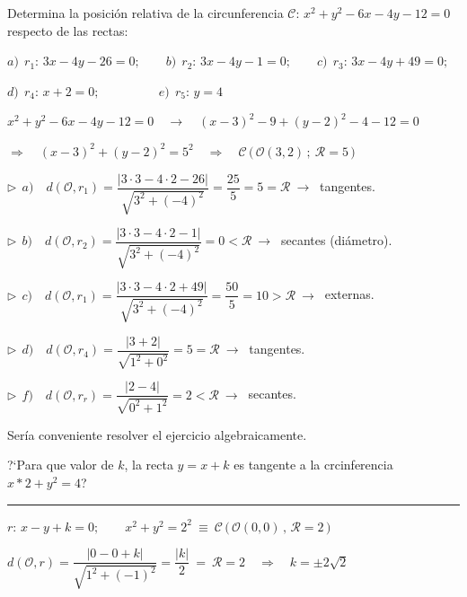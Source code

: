 \begin{miejemplo}

Determina la posición relativa de la circunferencia $\mathcal C:\, x^2+y^2-6x-4y-12=0$	 respecto de las rectas:

\vspace{2mm}$a)\ \ r_1:\, 3x-4y-26=0;\qquad b)\ \ r_2:\, 3x-4y-1=0;\qquad c)\ \ r_3:\, 3x-4y+49=0;$

\vspace{2mm}$d)\ \ r_4:\, x+2=0;\qquad \qquad \ \ \ e)\ \ r_5:\, y=4$

\vspace{6mm} $x^2+y^2-6x-4y-12=0 \quad \to \quad (x-3)^2-9+(y-2)^2-4-12=0 \ $

\vspace{2mm} \hspace{3cm} $\Rightarrow \quad (x-3)^2+(y-2)^2=5^2 \quad \Rightarrow \quad \mathcal C\, \Big( \, \mathcal O(3,2)\, ; \ \mathcal R=5\, \Big)$

\vspace{6mm} $\triangleright \ \ a)\quad d(\mathcal O,r_1)=\dfrac{|3\cdot 3-4\cdot 2-26|}{\sqrt{3^2+(-4)^2}}=\dfrac{25}{5}=5=\mathcal R \ \to \ $ tangentes.
 
\vspace{4mm} $\triangleright \ \ b)\quad d(\mathcal O,r_2)=\dfrac{|3\cdot 3-4\cdot 2-1|}{\sqrt{3^2+(-4)^2}}=0<\mathcal R \ \to \ $ secantes (diámetro).

\vspace{4mm} $\triangleright \ \ c)\quad d(\mathcal O,r_1)=\dfrac{|3\cdot 3-4\cdot 2+49|}{\sqrt{3^2+(-4)^2}}=\dfrac{50}{5}=10>\mathcal R \ \to \ $ externas.

\vspace{4mm} $\triangleright \ \ d)\quad d(\mathcal O,r_4)=\dfrac{|3+2|}{\sqrt{1^2+0^2}}=5=\mathcal R \ \to \ $ tangentes.

\vspace{4mm} $\triangleright \ \ f)\quad d(\mathcal O,r_r)=\dfrac{|2-4|}{\sqrt{0^2+1^2}}=2<\mathcal R \ \to \ $ secantes.

\vspace{6mm} Sería conveniente resolver el ejercicio algebraicamente.
\end{miejemplo}

\begin{miejercicio}

?`Para que valor de $k$, la recta $y=x+k$ es tangente a la crcinferencia $x*2+y^2=4$?	

\rule{250pt}{0.1pt}

\vspace{2mm} $r:\, x-y+k=0;\qquad x^2+y^2=2^2 \ \equiv \ \mathcal C \, \Big(\, \mathcal O(0,0)\, , \, \mathcal R=2\, \Big)$

\vspace{3mm} $d(\mathcal O,r)=\dfrac {|0-0+k|}{\sqrt{1^2+(-1)^2}}=\dfrac{|k|}{2} \ = \ \mathcal R=2 \quad \Rightarrow \quad k=\pm 2\sqrt{2}$
\end{miejercicio}


